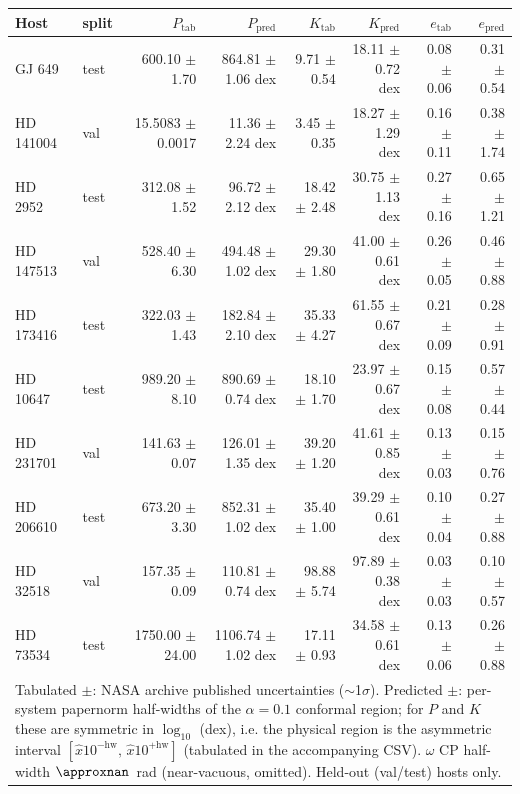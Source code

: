 \begin{tabular}{llrrrrrr}
\hline
Host & split & $P_{\mathrm{tab}}$ & $P_{\mathrm{pred}}$ & $K_{\mathrm{tab}}$ & $K_{\mathrm{pred}}$ & $e_{\mathrm{tab}}$ & $e_{\mathrm{pred}}$ \\
\hline
GJ 649 & test & 600.10 $\pm$ 1.70 & 864.81 $\pm$ 1.06 dex & 9.71 $\pm$ 0.54 & 18.11 $\pm$ 0.72 dex & 0.08 $\pm$ 0.06 & 0.31 $\pm$ 0.54 \\
HD 141004 & val & 15.5083 $\pm$ 0.0017 & 11.36 $\pm$ 2.24 dex & 3.45 $\pm$ 0.35 & 18.27 $\pm$ 1.29 dex & 0.16 $\pm$ 0.11 & 0.38 $\pm$ 1.74 \\
HD 2952 & test & 312.08 $\pm$ 1.52 & 96.72 $\pm$ 2.12 dex & 18.42 $\pm$ 2.48 & 30.75 $\pm$ 1.13 dex & 0.27 $\pm$ 0.16 & 0.65 $\pm$ 1.21 \\
HD 147513 & val & 528.40 $\pm$ 6.30 & 494.48 $\pm$ 1.02 dex & 29.30 $\pm$ 1.80 & 41.00 $\pm$ 0.61 dex & 0.26 $\pm$ 0.05 & 0.46 $\pm$ 0.88 \\
HD 173416 & test & 322.03 $\pm$ 1.43 & 182.84 $\pm$ 2.10 dex & 35.33 $\pm$ 4.27 & 61.55 $\pm$ 0.67 dex & 0.21 $\pm$ 0.09 & 0.28 $\pm$ 0.91 \\
HD 10647 & test & 989.20 $\pm$ 8.10 & 890.69 $\pm$ 0.74 dex & 18.10 $\pm$ 1.70 & 23.97 $\pm$ 0.67 dex & 0.15 $\pm$ 0.08 & 0.57 $\pm$ 0.44 \\
HD 231701 & val & 141.63 $\pm$ 0.07 & 126.01 $\pm$ 1.35 dex & 39.20 $\pm$ 1.20 & 41.61 $\pm$ 0.85 dex & 0.13 $\pm$ 0.03 & 0.15 $\pm$ 0.76 \\
HD 206610 & test & 673.20 $\pm$ 3.30 & 852.31 $\pm$ 1.02 dex & 35.40 $\pm$ 1.00 & 39.29 $\pm$ 0.61 dex & 0.10 $\pm$ 0.04 & 0.27 $\pm$ 0.88 \\
HD 32518 & val & 157.35 $\pm$ 0.09 & 110.81 $\pm$ 0.74 dex & 98.88 $\pm$ 5.74 & 97.89 $\pm$ 0.38 dex & 0.03 $\pm$ 0.03 & 0.10 $\pm$ 0.57 \\
HD 73534 & test & 1750.00 $\pm$ 24.00 & 1106.74 $\pm$ 1.02 dex & 17.11 $\pm$ 0.93 & 34.58 $\pm$ 0.61 dex & 0.13 $\pm$ 0.06 & 0.26 $\pm$ 0.88 \\
\hline
\multicolumn{8}{l}{\footnotesize Tabulated $\pm$: NASA archive published uncertainties ($\sim$1$\sigma$). Predicted $\pm$: per-system papernorm half-widths of the $\alpha{=}0.1$ conformal region; for $P$ and $K$ these are symmetric in $\log_{10}$ (dex), i.e. the physical region is the asymmetric interval $[\hat{x}10^{-\mathrm{hw}},\,\hat{x}10^{+\mathrm{hw}}]$ (tabulated in the accompanying CSV). $\omega$ CP half-width $\approxnan$~rad (near-vacuous, omitted). Held-out (val/test) hosts only.} \\
\end{tabular}
